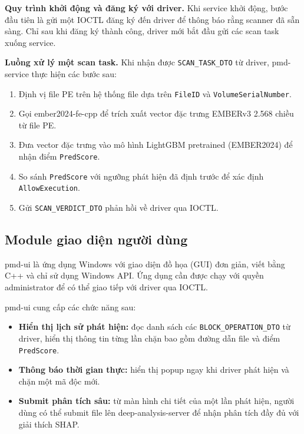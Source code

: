 \textbf{Quy trình khởi động và đăng ký với driver.}
Khi service khởi động, bước đầu tiên là gửi một IOCTL đăng ký đến
driver để thông báo rằng scanner đã sẵn sàng. Chỉ sau khi đăng ký
thành công, driver mới bắt đầu gửi các scan task xuống service.

\textbf{Luồng xử lý một scan task.}
Khi nhận được \texttt{SCAN\_TASK\_DTO} từ driver, pmd-service thực
hiện các bước sau:
\begin{enumerate}
    \item Định vị file PE trên hệ thống file dựa trên
        \texttt{FileID} và \texttt{VolumeSerialNumber}.
    \item Gọi ember2024-fe-cpp để trích xuất vector đặc trưng EMBERv3
        2.568 chiều từ file PE.
    \item Đưa vector đặc trưng vào mô hình LightGBM pretrained
        (EMBER2024) để nhận điểm \texttt{PredScore}.
    \item So sánh \texttt{PredScore} với ngưỡng phát hiện đã định
        trước để xác định \texttt{AllowExecution}.
    \item Gửi \texttt{SCAN\_VERDICT\_DTO} phản hồi về driver qua IOCTL.
\end{enumerate}

\subsection{Module giao diện người dùng}

pmd-ui là ứng dụng Windows với giao diện đồ họa (GUI) đơn giản, viết
bằng C++ và chỉ sử dụng Windows API. Ứng dụng cần được chạy với
quyền administrator để có thể giao tiếp với driver qua IOCTL.

pmd-ui cung cấp các chức năng sau:
\begin{itemize}
    \item \textbf{Hiển thị lịch sử phát hiện:} đọc danh sách các
        \texttt{BLOCK\_OPERATION\_DTO} từ driver, hiển thị thông tin
        từng lần chặn bao gồm đường dẫn file và điểm
        \texttt{PredScore}.
    \item \textbf{Thông báo thời gian thực:} hiển thị popup ngay khi
        driver phát hiện và chặn một mã độc mới.
    \item \textbf{Submit phân tích sâu:} từ màn hình chi tiết của một
        lần phát hiện, người dùng có thể submit file lên
        deep-analysis-server để nhận phân tích đầy đủ với giải thích
        SHAP.
\end{itemize}

